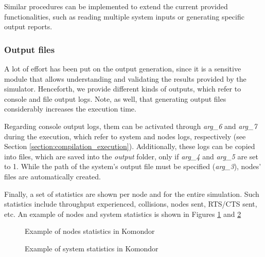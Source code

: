\documentclass[a4paper]{article}
\begin{document}
		Similar procedures can be implemented to extend the current provided functionalities, such as reading multiple system inputs or generating specific output reports.
		
		\subsubsection{Output files}
		\label{section:output_files}	
		A lot of effort has been put on the output generation, since it is a sensitive module that allows understanding and validating the results provided by the simulator. Henceforth, we provide different kinds of outputs, which refer to console and file output logs. Note, as well, that generating output files considerably increases the execution time. 
		
		Regarding console output logs, them can be activated through \emph{arg\_6} and \emph{arg\_7} during the execution, which refer to system and nodes logs, respectively (see Section \ref{section:compilation_execution}). Additionally, these logs can be copied into files, which are saved into the \emph{output} folder, only if \emph{arg\_4} and \emph{arg\_5} are set to 1. While the path of the system's output file must be specified (\emph{arg\_3}), nodes' files are automatically created. 
		
		Finally, a set of statistics are shown per node and for the entire simulation. Such statistics include throughput experienced, collisions, nodes sent, RTS/CTS sent, etc. An example of nodes and system statistics is shown in Figures \ref{fig:nodes_statistics_example} and \ref{fig:general_statistics_example}
		\begin{figure}[h!]
			\centering
			\caption{Example of nodes statistics in Komondor}
			\label{fig:nodes_statistics_example}
		\end{figure}
		
		\begin{figure}[h!]
			\centering
			\caption{Example of system statistics in Komondor}
			\label{fig:general_statistics_example}
		\end{figure}
	
\end{document}
